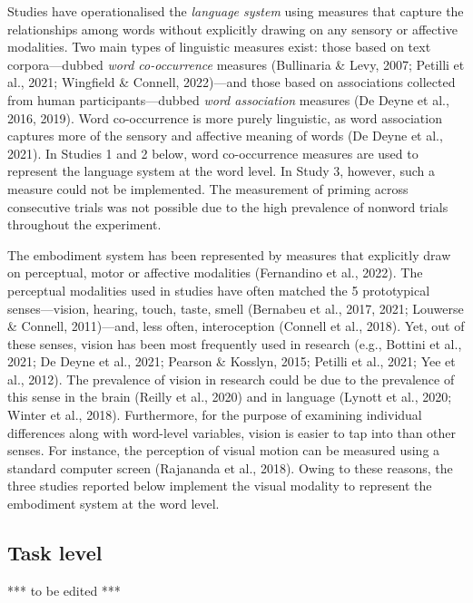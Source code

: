 \documentclass[
  12pt,
  man,floatsintext]{apa7}
\begin{document}
Studies have operationalised the \emph{language system} using measures that capture the relationships among words without explicitly drawing on any sensory or affective modalities. Two main types of linguistic measures exist: those based on text corpora---dubbed \emph{word co-occurrence} measures (Bullinaria \& Levy, 2007; Petilli et al., 2021; Wingfield \& Connell, 2022)---and those based on associations collected from human participants---dubbed \emph{word association} measures (De Deyne et al., 2016, 2019). Word co-occurrence is more purely linguistic, as word association captures more of the sensory and affective meaning of words (De Deyne et al., 2021). In Studies 1 and 2 below, word co-occurrence measures are used to represent the language system at the word level. In Study 3, however, such a measure could not be implemented. The measurement of priming across consecutive trials was not possible due to the high prevalence of nonword trials throughout the experiment.

The embodiment system has been represented by measures that explicitly draw on perceptual, motor or affective modalities (Fernandino et al., 2022). The perceptual modalities used in studies have often matched the 5 prototypical senses---vision, hearing, touch, taste, smell (Bernabeu et al., 2017, 2021; Louwerse \& Connell, 2011)---and, less often, interoception (Connell et al., 2018). Yet, out of these senses, vision has been most frequently used in research (e.g., Bottini et al., 2021; De Deyne et al., 2021; Pearson \& Kosslyn, 2015; Petilli et al., 2021; Yee et al., 2012). The prevalence of vision in research could be due to the prevalence of this sense in the brain (Reilly et al., 2020) and in language (Lynott et al., 2020; Winter et al., 2018). Furthermore, for the purpose of examining individual differences along with word-level variables, vision is easier to tap into than other senses. For instance, the perception of visual motion can be measured using a standard computer screen (Rajananda et al., 2018). Owing to these reasons, the three studies reported below implement the visual modality to represent the embodiment system at the word level.

\hypertarget{task-level}{%
\subsection{Task level}\label{task-level}}

*** to be edited ***
\end{document}
